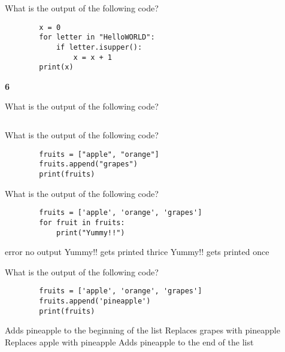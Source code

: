 \documentclass{exam}
\begin{document}
\begin{questions}
   \question What is the output of the following code?

    \begin{verbatim}
        x = 0
        for letter in "HelloWORLD":
            if letter.isupper():
                x = x + 1
        print(x)
    \end{verbatim}
    \begin{oneparchoices}
        \choice \textbf{6}
    \end{oneparchoices}

   \question What is the output of the following code?

    \begin{verbatim}
    \end{verbatim}
    \begin{oneparchoices}
    \end{oneparchoices}

   \question What is the output of the following code?

    \begin{verbatim}
        fruits = ["apple", "orange"]
        fruits.append("grapes")
        print(fruits)

    \end{verbatim}
    \begin{oneparchoices}
        \chocie ['grapes']
    \end{oneparchoices}

   \question What is the output of the following code?

    \begin{verbatim}
        fruits = ['apple', 'orange', 'grapes']
        for fruit in fruits:
            print("Yummy!!")
    \end{verbatim}
    \begin{oneparchoices}
        \choice error
        \choice no output
        \choice Yummy!! gets printed thrice
        \choice Yummy!! gets printed once
    \end{oneparchoices}

   \question What is the output of the following code?

    \begin{verbatim}
        fruits = ['apple', 'orange', 'grapes']
        fruits.append('pineapple')
        print(fruits)
    \end{verbatim}
    \begin{oneparchoices}
        \choice Adds pineapple to the beginning of the list
        \choice Replaces grapes with pineapple
        \choice Replaces apple with pineapple
        \choice Adds pineapple to the end of the list
    \end{oneparchoices}
    

\end{questions}
\end{document}
